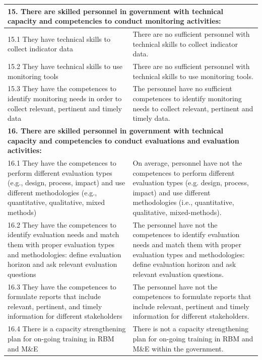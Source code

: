 \documentclass[
  10pt,
]{book}
\begin{document}
\begin{table}
\begin{tabular}[t]{l|l}
\hline
\multicolumn{2}{l}{\textbf{15. There are skilled personnel in government with technical capacity and competencies to conduct monitoring activities:}}\\
\hline
\hspace{1em}15.1 They have technical skills to collect indicator data & There are no sufficient personnel with technical skills to collect indicator data.\\
\hline
\hspace{1em}15.2 They have technical skills to use monitoring tools & There are no sufficient personnel with technical skills to use monitoring tools.\\
\hline
\hspace{1em}15.3 They have the competences to identify monitoring needs in order to collect relevant, pertinent and timely data & The personnel have no sufficient competences to identify monitoring needs to collect relevant, pertinent and timely data.\\
\hline
\multicolumn{2}{l}{\textbf{16. There are skilled personnel in government with technical capacity and competencies to conduct evaluations and evaluation activities:}}\\
\hline
\hspace{1em}16.1 They have the competences to perform different evaluation types (e.g., design, process, impact) and use different methodologies (e.g., quantitative, qualitative, mixed methods) & On average, personnel have not the competences to perform different evaluation types (e.g. design, process, impact) and use different methodologies (i.e., quantitative, qualitative, mixed-methods).\\
\hline
\hspace{1em}16.2 They have the competences to identify evaluation needs and match them with proper evaluation types and methodologies: define evaluation horizon and ask relevant evaluation questions & The personnel have not the competences to identify evaluation needs and match them with proper evaluation types and methodologies: define evaluation horizon and ask relevant evaluation questions.\\
\hline
\hspace{1em}16.3 They have the competences to formulate reports that include relevant, pertinent, and timely information for different stakeholders & The personnel have not the competences to formulate reports that include relevant, pertinent and timely information for different stakeholders.\\
\hline
\hspace{1em}16.4 There is a capacity strengthening plan for on-going training in RBM and M\&E & There is not a capacity strengthening plan for on-going training in RBM and M\&E within the government.\\
\hline
\end{tabular}
\end{table}
\end{document}
